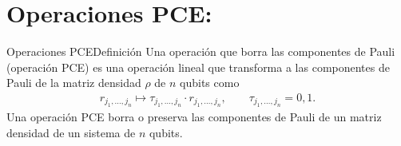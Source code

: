 \documentclass[xcolor=dvipsnames,presentation]{beamer}%
\begin{document}

\section{Operaciones PCE:}

\begin{frame}{Operaciones PCE}{Definición}
 	Una operación que borra las componentes de Pauli (operación PCE)
	es una operación lineal que transforma a las 	componentes 
	de Pauli de la matriz densidad $\rho$ de $n$ qubits como
	\begin{align*}
		r_{j_1,\ldots,j_n}\longmapsto \tau_{j_1,\ldots,j_n}\cdot r_{j_1,\ldots,j_n},
		\qquad \tau_{j_1,\ldots,j_n}=0,1.
		\end{align*} 
	Una operación PCE borra o preserva las componentes de Pauli 
	de un matriz densidad de un sistema de $n$ qubits.
\end{frame}
\end{document}
